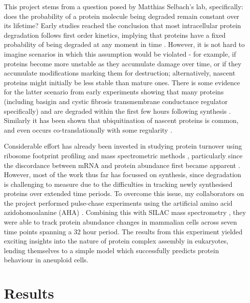 \documentclass[a4paper,11pt,twoside,openright]{scrbook}
\begin{document}
This project stems from a question posed by Matthias Selbach's lab, specifically: does the probability of a protein molecule being degraded remain constant over its lifetime? Early studies reached the conclusion that most intracellular protein degradation follows first order kinetics, implying that proteins have a fixed probability of being degraded at any moment in time \cite{Schimke1970,Goldberg1974}. However, it is not hard to imagine scenarios in which this assumption would be violated - for example, if proteins become more unstable as they accumulate damage over time, or if they accumulate modifications marking them for destruction; alternatively, nascent proteins might initially be less stable than mature ones. There is some evidence for the latter scenario from early experiments showing that many proteins (including basigin and cystic fibrosis transmembrane conductance regulator specifically) and are degraded within the first few hours following synthesis \cite{Wheatley1980,Tyler2012,Ward1994}. Similarly it has been shown that ubiquitination of nascent proteins is common, and even occurs co-translationally with some regularity \cite{Kim2011,Wang2013}.

Considerable effort has already been invested in studying protein turnover using ribosome footprint profiling and mass spectrometric methods  \cite{Ingolia2009,Ingolia2011,Doherty2009,Schwanhausser2011,Kristensen2013}, particularly since the discordance between mRNA and protein abundance first became apparent \cite{Gygi1999a,Chen2002}. However, most of the work thus far has focussed on synthesis, since degradation is challenging to measure due to the difficulties in tracking newly synthesised proteins over extended time periods. To overcome this issue, my collaborators on the project performed pulse-chase experiments using the artificial amino acid azidohomoalanine (AHA) \cite{Kiick2002,Dieterich2006}. Combining this with SILAC mass spectrometry \cite{Ong2002a}, they were able to track protein abundance changes in mammalian cells across seven time points spanning a 32 hour period. The results from this experiment yielded exciting insights into the nature of protein complex assembly in eukaryotes, lending themselves to a simple model which successfully predicts protein behaviour in aneuploid cells.

\section{Results}
\end{document}
